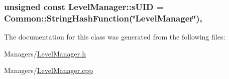 \subsubsection[{\texorpdfstring{s\+U\+ID}{sUID}}]{\setlength{\rightskip}{0pt plus 5cm}unsigned const Level\+Manager\+::s\+U\+ID = {\bf Common\+::\+String\+Hash\+Function}(\char`\"{}Level\+Manager\char`\"{})\hspace{0.3cm}{\ttfamily [static]}, {\ttfamily [private]}}\hypertarget{classLevelManager_a8273c8c0d95b17552ba0ddeff863195e}{}\label{classLevelManager_a8273c8c0d95b17552ba0ddeff863195e}


The documentation for this class was generated from the following files\+:\begin{DoxyCompactItemize}
\item 
Managers/\hyperlink{LevelManager_8h}{Level\+Manager.\+h}\item 
Managers/\hyperlink{LevelManager_8cpp}{Level\+Manager.\+cpp}\end{DoxyCompactItemize}
